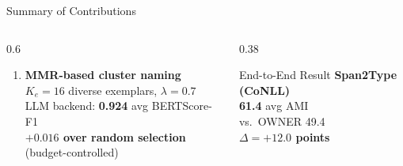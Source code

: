 \documentclass[aspectratio=169,10pt]{beamer}
\newcommand{\hg}[1]{\textcolor{dkgreen}{\textbf{#1}}}
\begin{document}
\begin{frame}{Summary of Contributions}
\begin{columns}[T]
\begin{column}{0.6\textwidth}
\begin{enumerate}
        \item \textbf{MMR-based cluster naming}\\
          $K_e=16$ diverse exemplars, $\lambda=0.7$\\
          LLM backend: \textbf{0.924} avg BERTScore-F1\\
          \hg{$+0.016$ over random selection} (budget-controlled)
      \end{enumerate}
    \end{column}
    \begin{column}{0.38\textwidth}
      \vspace{0.2em}
      \begin{exampleblock}{\centering End-to-End Result}
        \centering
        \textbf{Span2Type (CoNLL)}\\
        \textbf{61.4} avg AMI\\
        vs.\ OWNER 49.4\\
        \hg{$\Delta = +12.0$ points}
      \end{exampleblock}
    \end{column}
  \end{columns}
\end{frame}
\end{document}
